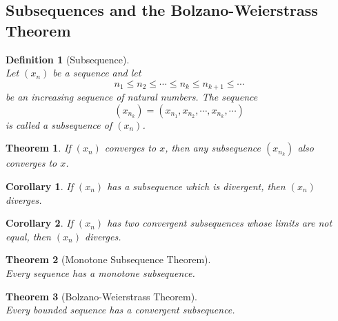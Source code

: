 \documentclass[8pt]{article}
\newtheorem{definition}{Definition}[section]
\newtheorem{theorem}{Theorem}[section]
\newtheorem{corollary}{Corollary}[section]
\theoremstyle{definition}
\begin{document}
\subsection{Subsequences and the Bolzano-Weierstrass Theorem}
\begin{definition}[Subsequence]
\hfill\\\normalfont Let $(x_n)$ be a sequence and let
\[
n_1\leq n_2\leq \cdots\leq n_k\leq n_{k+1}\leq \cdots
\]
be an increasing sequence of natural numbers. The sequence
\[
(x_{n_k})=(x_{n_1},x_{n_2},\cdots,x_{n_k},\cdots)
\]
is called a subsequence of $(x_n)$.
\end{definition}
\begin{theorem}\normalfont If $(x_n)$ converges to $x$, then any subsequence $(x_{n_k})$ also converges to $x$.
\end{theorem}
\begin{corollary}\normalfont If $(x_n)$ has a subsequence which is divergent, then $(x_n)$ diverges.
\end{corollary}
\begin{corollary}\normalfont If $(x_n)$ has two convergent subsequences whose limits are not equal, then $(x_n)$ diverges.
\end{corollary}
\begin{theorem}[Monotone Subsequence Theorem]
\hfill\\\normalfont Every sequence has a monotone subsequence.
\end{theorem}
\begin{theorem}[Bolzano-Weierstrass Theorem]
\hfill\\\normalfont Every bounded sequence has a convergent subsequence.
\end{theorem}
\end{document}
